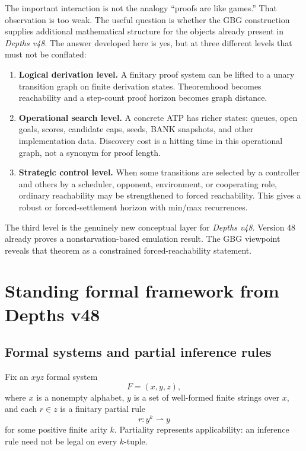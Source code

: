 \documentclass[11pt]{article}
\theoremstyle{remark}
\begin{document}
The important interaction is not the analogy ``proofs are like games.'' That observation is too weak. The useful question is whether the GBG construction supplies additional mathematical structure for the objects already present in \emph{Depths v48}. The answer developed here is yes, but at three different levels that must not be conflated:
\begin{enumerate}[label=\textbf{L\arabic*.},leftmargin=3.2em]
\item \textbf{Logical derivation level.} A finitary proof system can be lifted to a unary transition graph on finite derivation states. Theoremhood becomes reachability and a step-count proof horizon becomes graph distance.
\item \textbf{Operational search level.} A concrete ATP has richer states: queues, open goals, scores, candidate caps, seeds, BANK snapshots, and other implementation data. Discovery cost is a hitting time in this operational graph, not a synonym for proof length.
\item \textbf{Strategic control level.} When some transitions are selected by a controller and others by a scheduler, opponent, environment, or cooperating role, ordinary reachability may be strengthened to forced reachability. This gives a robust or forced-settlement horizon with min/max recurrences.
\end{enumerate}

The third level is the genuinely new conceptual layer for \emph{Depths v48}. Version 48 already proves a nonstarvation-based emulation result. The GBG viewpoint reveals that theorem as a constrained forced-reachability statement.

\section{Standing formal framework from Depths v48}

\subsection{Formal systems and partial inference rules}

Fix an $xyz$ formal system
\[
F=(x,y,z),
\]
where $x$ is a nonempty alphabet, $y$ is a set of well-formed finite strings over $x$, and each $r\in z$ is a finitary partial rule
\[
r:y^k\rightharpoonup y
\]
for some positive finite arity $k$. Partiality represents applicability: an inference rule need not be legal on every $k$-tuple.
\end{document}
